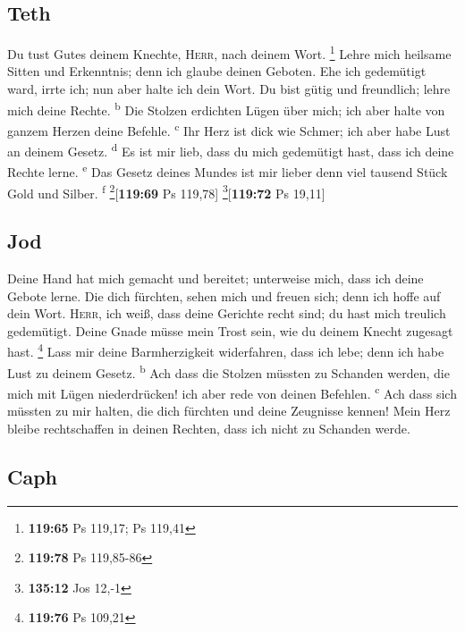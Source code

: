 \hypertarget{teth}{%
\subsection{Teth}\label{teth}}

 Du tust Gutes deinem Knechte, \textsc{Herr}, nach deinem
Wort. \footnote{\textbf{119:65} Ps 119,17; Ps 119,41} 
Lehre mich heilsame Sitten und Erkenntnis; denn ich glaube deinen
Geboten.  Ehe ich gedemütigt ward, irrte ich; nun aber
halte ich dein Wort.  Du bist gütig und freundlich; lehre
mich deine Rechte. \textsuperscript{b}  Die Stolzen
erdichten Lügen über mich; ich aber halte von ganzem Herzen deine
Befehle. \textsuperscript{c}  Ihr Herz ist dick wie
Schmer; ich aber habe Lust an deinem Gesetz. \textsuperscript{d}
 Es ist mir lieb, dass du mich gedemütigt hast, dass ich
deine Rechte lerne. \textsuperscript{e}  Das Gesetz
deines Mundes ist mir lieber denn viel tausend Stück Gold und Silber.
\textsuperscript{f} \footnote{\textbf{119:78} Ps 119,85-86}{[}\textbf{119:69}
Ps 119,78{]} \footnote{\textbf{135:12} Jos 12,-1}{[}\textbf{119:72} Ps
19,11{]}

\hypertarget{jod}{%
\subsection{Jod}\label{jod}}

 Deine Hand hat mich gemacht und bereitet; unterweise
mich, dass ich deine Gebote lerne.  Die dich fürchten,
sehen mich und freuen sich; denn ich hoffe auf dein Wort.
 \textsc{Herr}, ich weiß, dass deine Gerichte recht sind;
du hast mich treulich gedemütigt.  Deine Gnade müsse mein
Trost sein, wie du deinem Knecht zugesagt hast. \footnote{\textbf{119:76}
  Ps 109,21}  Lass mir deine Barmherzigkeit widerfahren,
dass ich lebe; denn ich habe Lust zu deinem Gesetz. \textsuperscript{b}
 Ach dass die Stolzen müssten zu Schanden werden, die
mich mit Lügen niederdrücken! ich aber rede von deinen Befehlen.
\textsuperscript{c}  Ach dass sich müssten zu mir halten,
die dich fürchten und deine Zeugnisse kennen!  Mein Herz
bleibe rechtschaffen in deinen Rechten, dass ich nicht zu Schanden
werde.

\hypertarget{caph}{%
\subsection{Caph}\label{caph}}


